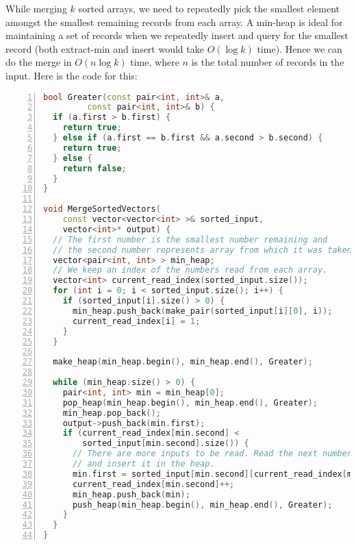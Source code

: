 While merging $k$ sorted arrays, we need to repeatedly pick the smallest
element amongst the smallest remaining records from each array. A 
min-heap is ideal for maintaining a set of records when we  
repeatedly insert and query for the smallest record (both extract-min and insert
would take $O(\log k)$ time). Hence we can do the merge in $O(n\log k)$ time,
where $n$ is the total number of records in the input. Here is the
code for this:

\begin{lstlisting}[basicstyle=\footnotesize,numbers=left,breaklines=true,language=C++]
bool Greater(const pair<int, int>& a,
	     const pair<int, int>& b) {
  if (a.first > b.first) {
    return true;
  } else if (a.first == b.first && a.second > b.second) {
    return true;
  } else {
    return false;
  }
} 

void MergeSortedVectors(
    const vector<vector<int> >& sorted_input, 
    vector<int>* output) {
  // The first number is the smallest number remaining and
  // the second number represents array from which it was taken.
  vector<pair<int, int> > min_heap;
  // We keep an index of the numbers read from each array.
  vector<int> current_read_index(sorted_input.size());
  for (int i = 0; i < sorted_input.size(); i++) {
    if (sorted_input[i].size() > 0) {
      min_heap.push_back(make_pair(sorted_input[i][0], i));
      current_read_index[i] = 1;
    }
  }

  make_heap(min_heap.begin(), min_heap.end(), Greater);

  while (min_heap.size() > 0) {
    pair<int, int> min = min_heap[0];
    pop_heap(min_heap.begin(), min_heap.end(), Greater);
    min_heap.pop_back();
    output->push_back(min.first);
    if (current_read_index[min.second] <
        sorted_input[min.second].size()) {
      // There are more inputs to be read. Read the next number
      // and insert it in the heap.
      min.first = sorted_input[min.second][current_read_index[min.second]];
      current_read_index[min.second]++;
      min_heap.push_back(min);
      push_heap(min_heap.begin(), min_heap.end(), Greater);
    }
  } 
}
\end{lstlisting}


